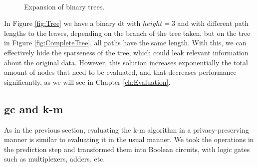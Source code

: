 \begin{figure}[ht]
	\centering
	\mbox{
	}
	\caption{Expansion of binary trees.}
    \label{fig:ExpansionBinaryTrees}
\end{figure}
In Figure \ref{fig:Tree} we have a binary \ac{dt} with $height=3$ and with different path lengths to the leaves, depending on the branch of the tree taken, but on the tree in Figure \ref{fig:CompleteTree}, all paths have the same length. With this, we can effectively hide the sparseness of the tree, which could leak relevant information about the original data. However, this solution increases exponentially the total amount of nodes that need to be evaluated, and that decreases performance significantly, as we will see in Chapter \ref{ch:Evaluation}.
                


\subsection{\acl{gc} and \acl{k-m}}
\label{ssec:GCandk-M}


As in the previous section, evaluating the \ac{k-m} algorithm in a privacy-preserving manner is similar to evaluating it in the usual manner. We took the operations in the prediction step and transformed them into Boolean circuits, with logic gates such as multiplexers, adders, etc.

